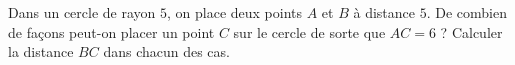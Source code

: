 \begin{exo}%
Dans un cercle de rayon $5$, on place deux points $A$ et $B$ à distance $5$. De combien de façons peut-on placer un point $C$ sur le cercle de sorte que $AC=6$ ?  Calculer la distance $BC$ dans chacun des cas.


\end{exo}
